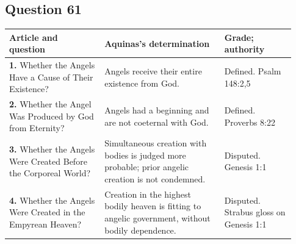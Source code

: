 \subsection{Question 61}
\begin{longtable}{@{}>{\raggedright\arraybackslash}p{0.31\linewidth}>{\raggedright\arraybackslash}p{0.39\linewidth}>{\raggedright\arraybackslash}p{0.23\linewidth}@{}}
\toprule
Article and question & Aquinas's determination & Grade; authority\\
\midrule\endhead
\textbf{1.} Whether the Angels Have a Cause of Their Existence? & Angels receive their entire existence from God. & Defined. Psalm 148:2,5\\
\textbf{2.} Whether the Angel Was Produced by God from Eternity? & Angels had a beginning and are not coeternal with God. & Defined. Proverbs 8:22\\
\textbf{3.} Whether the Angels Were Created Before the Corporeal World? & Simultaneous creation with bodies is judged more probable; prior angelic creation is not condemned. & Disputed. Genesis 1:1\\
\textbf{4.} Whether the Angels Were Created in the Empyrean Heaven? & Creation in the highest bodily heaven is fitting to angelic government, without bodily dependence. & Disputed. Strabus gloss on Genesis 1:1\\
\bottomrule
\end{longtable}
